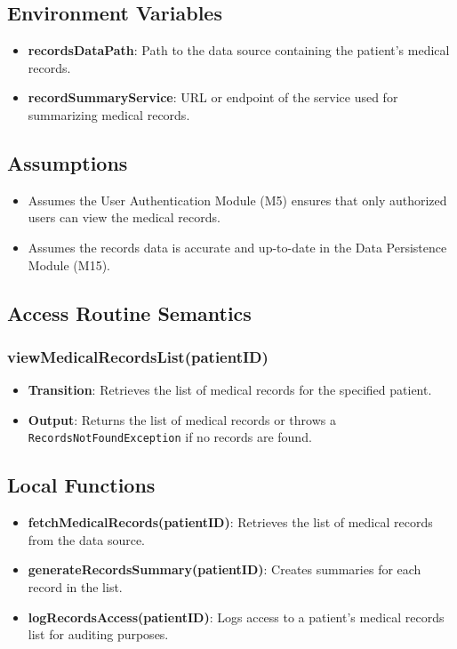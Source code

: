 \documentclass[12pt, titlepage]{article}
\begin{document}
\subsection{Environment Variables}
\begin{itemize}
\item \textbf{recordsDataPath}: Path to the data source containing the patient's medical records.
\item \textbf{recordSummaryService}: URL or endpoint of the service used for summarizing medical records.
\end{itemize}

\subsection{Assumptions}
\begin{itemize}
\item Assumes the User Authentication Module (M5) ensures that only authorized users can view the medical records.
\item Assumes the records data is accurate and up-to-date in the Data Persistence Module (M15).
\end{itemize}

\subsection{Access Routine Semantics}
\subsubsection{viewMedicalRecordsList(patientID)}
\begin{itemize}
    \item \textbf{Transition}: Retrieves the list of medical records for the specified patient.
    \item \textbf{Output}: Returns the list of medical records or throws a \texttt{RecordsNotFoundException} if no records are found.
\end{itemize}

\subsection{Local Functions}
\begin{itemize}
\item \textbf{fetchMedicalRecords(patientID)}: Retrieves the list of medical records from the data source.
\item \textbf{generateRecordsSummary(patientID)}: Creates summaries for each record in the list.
\item \textbf{logRecordsAccess(patientID)}: Logs access to a patient's medical records list for auditing purposes.
\end{itemize}
\end{document}

